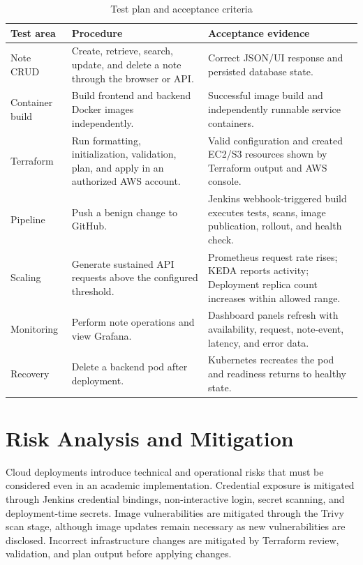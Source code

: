 \documentclass[12pt,a4paper]{article}
\begin{document}
\begin{table}[htbp]
\caption{Test plan and acceptance criteria}
\label{tab:testplan}
\centering
\begin{tabular}{p{}p{}p{}}
\hline
\textbf{Test area} & \textbf{Procedure} & \textbf{Acceptance evidence} \\
\hline
Note CRUD & Create, retrieve, search, update, and delete a note through the browser or API. & Correct JSON/UI response and persisted database state. \\
Container build & Build frontend and backend Docker images independently. & Successful image build and independently runnable service containers. \\
Terraform & Run formatting, initialization, validation, plan, and apply in an authorized AWS account. & Valid configuration and created EC2/S3 resources shown by Terraform output and AWS console. \\
Pipeline & Push a benign change to GitHub. & Jenkins webhook-triggered build executes tests, scans, image publication, rollout, and health check. \\
Scaling & Generate sustained API requests above the configured threshold. & Prometheus request rate rises; KEDA reports activity; Deployment replica count increases within allowed range. \\
Monitoring & Perform note operations and view Grafana. & Dashboard panels refresh with availability, request, note-event, latency, and error data. \\
Recovery & Delete a backend pod after deployment. & Kubernetes recreates the pod and readiness returns to healthy state. \\
\hline
\end{tabular}
\end{table}

\section{Risk Analysis and Mitigation}
Cloud deployments introduce technical and operational risks that must be considered even in an academic implementation. Credential exposure is mitigated through Jenkins credential bindings, non-interactive login, secret scanning, and deployment-time secrets. Image vulnerabilities are mitigated through the Trivy scan stage, although image updates remain necessary as new vulnerabilities are disclosed. Incorrect infrastructure changes are mitigated by Terraform review, validation, and plan output before applying changes.
\end{document}
